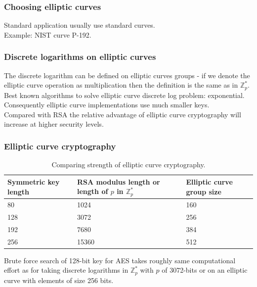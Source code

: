 \documentclass{article}
\begin{document}
\subsubsection{Choosing elliptic curves}

Standard application usually use standard curves.\\
Example: NIST curve P-192.

\subsubsection{Discrete logarithms on elliptic curves}

The discrete logarithm can be defined on elliptic curves groups - if we denote the elliptic curve operation as multiplication then the definition is the same as in $\mathbb{Z}_p^*$.\\
Best known algorithms to solve elliptic curve discrete log problem: exponential. Consequently elliptic curve implementations use much smaller keys.\\
Compared with RSA the relative advantage of elliptic curve cryptography will increase at higher security levels.

\subsubsection{Elliptic curve cryptography}

\begin{table}[H]
\begin{center}
\begin{tabular}{ | p{3.5cm} | p{3.5cm} | p{3.5cm} | }
\hline
Symmetric key length  & RSA modulus length or length of $p$ in $\mathbb{Z}_p^*$ & Elliptic curve group size \\
\hline
80 & 1024 & 160\\
\hline
128 & 3072 & 256\\
\hline
192 & 7680 & 384\\
\hline
256 & 15360 & 512\\
\hline
\end{tabular}
\caption{Comparing strength of elliptic curve cryptography.}
\end{center}
\end{table}

Brute force search of 128-bit key for AES takes roughly same computational effort as for taking discrete logarithms in $\mathbb{Z}_p^*$ with $p$ of 3072-bits or on an elliptic curve with elements of size 256 bits.
\end{document}

